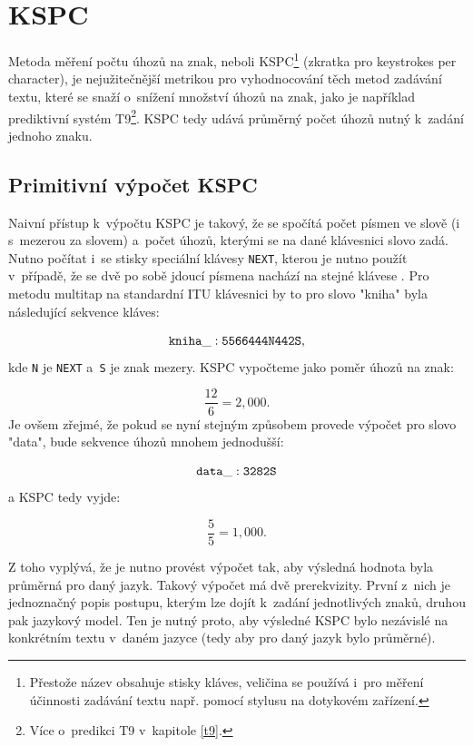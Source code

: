 \documentclass[a4paper,11pt,openany]{book} %
\begin{document}
\section{KSPC}

Metoda měření počtu úhozů na znak, neboli KSPC\footnote{Přestože název obsahuje stisky kláves, veličina se používá i~pro měření účinnosti zadávání textu např. pomocí stylusu na dotykovém zařízení.} (zkratka pro keystrokes per character), je nejužitečnější metrikou pro vyhodnocování těch metod zadávání textu, které se snaží o~snížení množství úhozů na znak, jako  je například prediktivní systém T9\footnote{Více o~predikci T9 v~kapitole \ref{t9}.}. KSPC tedy udává průměrný počet úhozů nutný k~zadání jednoho znaku.

\subsection{Primitivní výpočet KSPC}

Naivní přístup k~výpočtu KSPC je takový, že se spočítá počet písmen ve slově (i s~mezerou za slovem) a~počet úhozů, kterými se na dané klávesnici slovo zadá. Nutno počítat i~se stisky speciální klávesy {\tt NEXT}, kterou je nutno použít v~případě, že se dvě po sobě jdoucí písmena nachází na stejné klávese \parencite[10]{silfverberg2000predicting}. %
Pro metodu multitap na standardní ITU klávesnici by to pro slovo "kniha" byla následující sekvence kláves:

\[
	{\tt kniha\_: 5566444N442S},
\]
kde {\tt N} je {\tt NEXT} a~{\tt S} je znak mezery. KSPC vypočteme jako poměr úhozů na znak:

\[
	\frac{12}{6} = 2,000.
\]
Je ovšem zřejmé, že pokud se nyní stejným způsobem provede výpočet pro slovo "data", bude sekvence úhozů mnohem jednodušší:

\[
	{\tt data\_: 3282S}
\]
a KSPC tedy vyjde:

\[
	\frac{5}{5} = 1,000.
\]

Z toho vyplývá, že je nutno provést výpočet tak, aby výsledná hodnota byla průměrná pro daný jazyk. Takový výpočet má dvě prerekvizity. První z~nich je jednoznačný popis postupu, kterým lze dojít k~zadání jednotlivých znaků, druhou pak jazykový model. Ten je nutný proto, aby výsledné KSPC bylo nezávislé na konkrétním textu v~daném jazyce (tedy aby pro daný jazyk bylo průměrné). \parencite[196]{mackenzie2002kspc}
\end{document}
